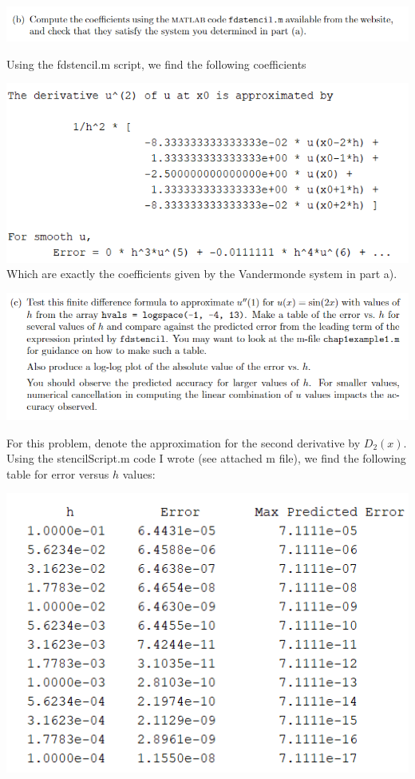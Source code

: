 \documentclass{article}
\begin{document}
\includegraphics[scale = 0.8]{ex1.2b.PNG}
\newline

Using the fdstencil.m script, we find the following coefficients

\includegraphics[]{fdstencilcoeff.PNG}
\newline
Which are exactly the coefficients given by the Vandermonde system in part a).
\newline

\includegraphics[scale = 0.8]{ex1.2c.PNG}
\newline

For this problem, denote the approximation for the second derivative by $D_2(x)$. Using the stencilScript.m code I wrote (see attached m file), we find the following table for error versus $h$ values:

\begin{center}
    \includegraphics[scale = 0.8]{err and pred err2.PNG}
\end{center}
\end{document}
